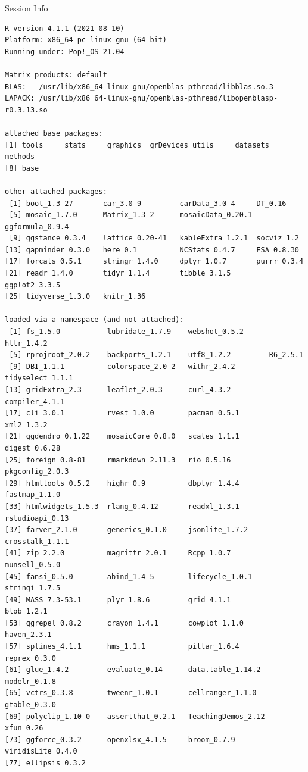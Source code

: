 \documentclass[10pt]{beamer}\usepackage[]{graphicx}\usepackage[]{color}
\makeatletter
\newenvironment{kframe}{%
 \def\at@end@of@kframe{}%
 \ifinner\ifhmode%
  \def\at@end@of@kframe{\end{minipage}}%
  \begin{minipage}{\columnwidth}%
 \fi\fi%
 \def\FrameCommand##1{\hskip\@totalleftmargin \hskip-\fboxsep
 \colorbox{shadecolor}{##1}\hskip-\fboxsep
     \hskip-\linewidth \hskip-\@totalleftmargin \hskip\columnwidth}%
 \MakeFramed {\advance\hsize-\width
   \@totalleftmargin\z@ \linewidth\hsize
   \@setminipage}}%
 {\par\unskip\endMakeFramed%
 \at@end@of@kframe}
\newenvironment{knitrout}{}{} %
\makeatother
\begin{document}
\begin{frame}[fragile]{Session Info}
	\tiny
	
\begin{knitrout}\tiny
{}\color{fgcolor}\begin{kframe}
\begin{verbatim}
R version 4.1.1 (2021-08-10)
Platform: x86_64-pc-linux-gnu (64-bit)
Running under: Pop!_OS 21.04

Matrix products: default
BLAS:   /usr/lib/x86_64-linux-gnu/openblas-pthread/libblas.so.3
LAPACK: /usr/lib/x86_64-linux-gnu/openblas-pthread/libopenblasp-r0.3.13.so

attached base packages:
[1] tools     stats     graphics  grDevices utils     datasets  methods  
[8] base     

other attached packages:
 [1] boot_1.3-27       car_3.0-9         carData_3.0-4     DT_0.16          
 [5] mosaic_1.7.0      Matrix_1.3-2      mosaicData_0.20.1 ggformula_0.9.4  
 [9] ggstance_0.3.4    lattice_0.20-41   kableExtra_1.2.1  socviz_1.2       
[13] gapminder_0.3.0   here_0.1          NCStats_0.4.7     FSA_0.8.30       
[17] forcats_0.5.1     stringr_1.4.0     dplyr_1.0.7       purrr_0.3.4      
[21] readr_1.4.0       tidyr_1.1.4       tibble_3.1.5      ggplot2_3.3.5    
[25] tidyverse_1.3.0   knitr_1.36       

loaded via a namespace (and not attached):
 [1] fs_1.5.0           lubridate_1.7.9    webshot_0.5.2      httr_1.4.2        
 [5] rprojroot_2.0.2    backports_1.2.1    utf8_1.2.2         R6_2.5.1          
 [9] DBI_1.1.1          colorspace_2.0-2   withr_2.4.2        tidyselect_1.1.1  
[13] gridExtra_2.3      leaflet_2.0.3      curl_4.3.2         compiler_4.1.1    
[17] cli_3.0.1          rvest_1.0.0        pacman_0.5.1       xml2_1.3.2        
[21] ggdendro_0.1.22    mosaicCore_0.8.0   scales_1.1.1       digest_0.6.28     
[25] foreign_0.8-81     rmarkdown_2.11.3   rio_0.5.16         pkgconfig_2.0.3   
[29] htmltools_0.5.2    highr_0.9          dbplyr_1.4.4       fastmap_1.1.0     
[33] htmlwidgets_1.5.3  rlang_0.4.12       readxl_1.3.1       rstudioapi_0.13   
[37] farver_2.1.0       generics_0.1.0     jsonlite_1.7.2     crosstalk_1.1.1   
[41] zip_2.2.0          magrittr_2.0.1     Rcpp_1.0.7         munsell_0.5.0     
[45] fansi_0.5.0        abind_1.4-5        lifecycle_1.0.1    stringi_1.7.5     
[49] MASS_7.3-53.1      plyr_1.8.6         grid_4.1.1         blob_1.2.1        
[53] ggrepel_0.8.2      crayon_1.4.1       cowplot_1.1.0      haven_2.3.1       
[57] splines_4.1.1      hms_1.1.1          pillar_1.6.4       reprex_0.3.0      
[61] glue_1.4.2         evaluate_0.14      data.table_1.14.2  modelr_0.1.8      
[65] vctrs_0.3.8        tweenr_1.0.1       cellranger_1.1.0   gtable_0.3.0      
[69] polyclip_1.10-0    assertthat_0.2.1   TeachingDemos_2.12 xfun_0.26         
[73] ggforce_0.3.2      openxlsx_4.1.5     broom_0.7.9        viridisLite_0.4.0 
[77] ellipsis_0.3.2    
\end{verbatim}
\end{kframe}
\end{knitrout}
	
\end{frame}
\end{document}
